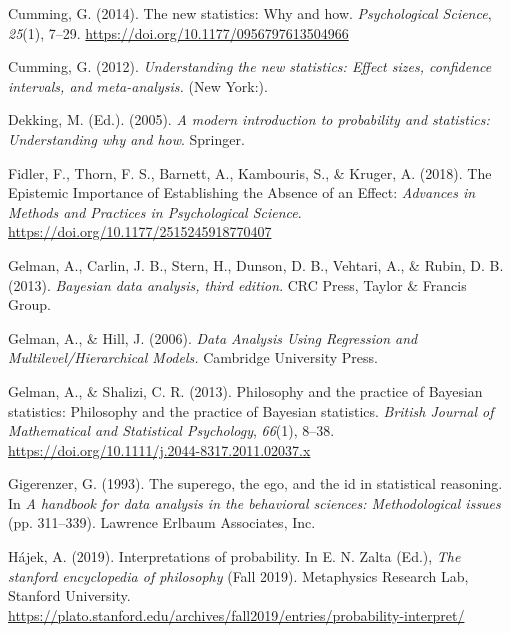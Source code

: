 \documentclass[
  a4paper,11pt,twoside,onecolumn,openright,final,oldfontcommands]{memoir}
\newlength{\cslhangindent}
\newlength{\cslentryspacingunit} %
\newenvironment{CSLReferences}[2] %
 {%
  \setlength{\parindent}{0pt}
  \ifodd #1
  \let\oldpar\par
  \def\par{\hangindent=\cslhangindent\oldpar}
  \fi
  \setlength{\parskip}{#2\cslentryspacingunit}
 }%
 {}
\theoremstyle{definition}
\theoremstyle{definition}
\theoremstyle{definition}
\theoremstyle{definition}
\theoremstyle{remark}
\begin{document}
\begin{CSLReferences}{1}{0}
\leavevmode{}%
Cumming, G. (2014). The new statistics: {Why} and how. \emph{Psychological Science}, \emph{25}(1), 7--29. \url{https://doi.org/10.1177/0956797613504966}

\leavevmode{}%
Cumming, G. (2012). \emph{Understanding the new statistics: {Effect} sizes, confidence intervals, and meta-analysis.} (New York:).

\leavevmode{}%
Dekking, M. (Ed.). (2005). \emph{A modern introduction to probability and statistics: Understanding why and how}. Springer.

\leavevmode{}%
Fidler, F., Thorn, F. S., Barnett, A., Kambouris, S., \& Kruger, A. (2018). The {Epistemic} {Importance} of {Establishing} the {Absence} of an {Effect}: \emph{Advances in Methods and Practices in Psychological Science}. \url{https://doi.org/10.1177/2515245918770407}

\leavevmode{}%
Gelman, A., Carlin, J. B., Stern, H., Dunson, D. B., Vehtari, A., \& Rubin, D. B. (2013). \emph{Bayesian data analysis, third edition}. CRC Press, Taylor \& Francis Group.

\leavevmode{}%
Gelman, A., \& Hill, J. (2006). \emph{Data {Analysis} {Using} {Regression} and {Multilevel}/{Hierarchical} {Models}.} Cambridge University Press.

\leavevmode{}%
Gelman, A., \& Shalizi, C. R. (2013). Philosophy and the practice of {Bayesian} statistics: {Philosophy} and the practice of {Bayesian} statistics. \emph{British Journal of Mathematical and Statistical Psychology}, \emph{66}(1), 8--38. \url{https://doi.org/10.1111/j.2044-8317.2011.02037.x}

\leavevmode{}%
Gigerenzer, G. (1993). The superego, the ego, and the id in statistical reasoning. In \emph{A handbook for data analysis in the behavioral sciences: {Methodological} issues} (pp. 311--339). Lawrence Erlbaum Associates, Inc.

\leavevmode{}%
Hájek, A. (2019). Interpretations of probability. In E. N. Zalta (Ed.), \emph{The stanford encyclopedia of philosophy} (Fall 2019). Metaphysics Research Lab, Stanford University. \url{https://plato.stanford.edu/archives/fall2019/entries/probability-interpret/}


\end{CSLReferences}
\end{document}
